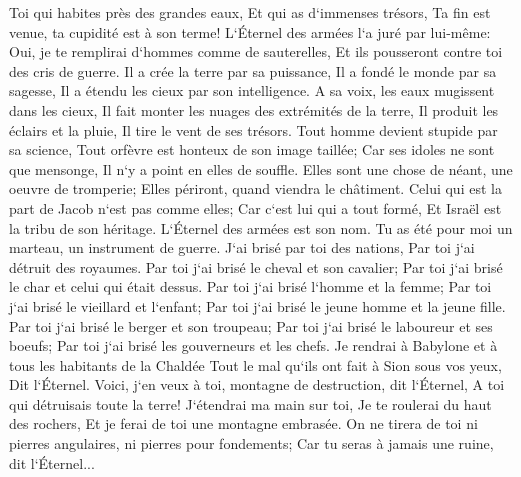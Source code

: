\verse Toi qui habites près des grandes eaux, Et qui as d`immenses trésors, Ta fin est venue, ta cupidité est à son terme! 
\verse L`Éternel des armées l`a juré par lui-même: Oui, je te remplirai d`hommes comme de sauterelles, Et ils pousseront contre toi des cris de guerre. 
\verse Il a crée la terre par sa puissance, Il a fondé le monde par sa sagesse, Il a étendu les cieux par son intelligence. 
\verse A sa voix, les eaux mugissent dans les cieux, Il fait monter les nuages des extrémités de la terre, Il produit les éclairs et la pluie, Il tire le vent de ses trésors. 
\verse Tout homme devient stupide par sa science, Tout orfèvre est honteux de son image taillée; Car ses idoles ne sont que mensonge, Il n`y a point en elles de souffle. 
\verse Elles sont une chose de néant, une oeuvre de tromperie; Elles périront, quand viendra le châtiment. 
\verse Celui qui est la part de Jacob n`est pas comme elles; Car c`est lui qui a tout formé, Et Israël est la tribu de son héritage. L`Éternel des armées est son nom. 
\verse Tu as été pour moi un marteau, un instrument de guerre. J`ai brisé par toi des nations, Par toi j`ai détruit des royaumes. 
\verse Par toi j`ai brisé le cheval et son cavalier; Par toi j`ai brisé le char et celui qui était dessus. 
\verse Par toi j`ai brisé l`homme et la femme; Par toi j`ai brisé le vieillard et l`enfant; Par toi j`ai brisé le jeune homme et la jeune fille. 
\verse Par toi j`ai brisé le berger et son troupeau; Par toi j`ai brisé le laboureur et ses boeufs; Par toi j`ai brisé les gouverneurs et les chefs. 
\verse Je rendrai à Babylone et à tous les habitants de la Chaldée Tout le mal qu`ils ont fait à Sion sous vos yeux, Dit l`Éternel. 
\verse Voici, j`en veux à toi, montagne de destruction, dit l`Éternel, A toi qui détruisais toute la terre! J`étendrai ma main sur toi, Je te roulerai du haut des rochers, Et je ferai de toi une montagne embrasée. 
\verse On ne tirera de toi ni pierres angulaires, ni pierres pour fondements; Car tu seras à jamais une ruine, dit l`Éternel... 

